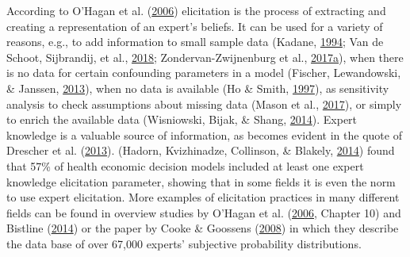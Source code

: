 \documentclass[openright,titlepage,12pt,a4paper]{book}
\begin{document}
According to O'Hagan et al. (\protect\hyperlink{ref-ohagan_uncertain_2006}{2006}) elicitation is the process of extracting and creating a representation of an expert's beliefs. It can be used for a variety of reasons, e.g., to add information to small sample data (Kadane, \protect\hyperlink{ref-kadane_application_1994}{1994}; Van de Schoot, Sijbrandij, et al., \protect\hyperlink{ref-van_de_schoot_bayesian_2018}{2018}; Zondervan-Zwijnenburg et al., \protect\hyperlink{ref-zondervan-zwijnenburg_where_2017}{2017}\protect\hyperlink{ref-zondervan-zwijnenburg_where_2017}{a}), when there is no data for certain confounding parameters in a model (Fischer, Lewandowski, \& Janssen, \protect\hyperlink{ref-fischer_estimating_2013}{2013}), when no data is available (Ho \& Smith, \protect\hyperlink{ref-ho_volcanic_1997}{1997}), as sensitivity analysis to check assumptions about missing data (Mason et al., \protect\hyperlink{ref-mason_development_2017}{2017}), or simply to enrich the available data (Wisniowski, Bijak, \& Shang, \protect\hyperlink{ref-wisniowski_forecasting_2014}{2014}). Expert knowledge is a valuable source of information, as becomes evident in the quote of Drescher et al. (\protect\hyperlink{ref-drescher_toward_2013}{2013}). (Hadorn, Kvizhinadze, Collinson, \& Blakely, \protect\hyperlink{ref-hadorn_useof_2014}{2014}) found that 57\% of health economic decision models included at least one expert knowledge elicitation parameter, showing that in some fields it is even the norm to use expert elicitation. More examples of elicitation practices in many different fields can be found in overview studies by O'Hagan et al. (\protect\hyperlink{ref-ohagan_uncertain_2006}{2006}, Chapter 10) and Bistline (\protect\hyperlink{ref-bistline_energy_2014}{2014}) or the paper by Cooke \& Goossens (\protect\hyperlink{ref-cooke_tu_2008}{2008}) in which they describe the data base of over 67,000 experts' subjective probability distributions.
\end{document}
